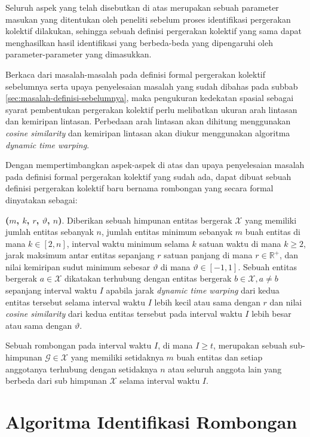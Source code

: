 Seluruh aspek yang telah disebutkan di atas merupakan sebuah parameter masukan yang ditentukan oleh peneliti sebelum proses identifikasi pergerakan kolektif dilakukan, sehingga sebuah definisi pergerakan kolektif yang sama dapat menghasilkan hasil identifikasi yang berbeda-beda yang dipengaruhi oleh parameter-parameter yang dimasukkan.

Berkaca dari masalah-masalah pada definisi formal pergerakan kolektif sebelumnya serta upaya penyelesaian masalah yang sudah dibahas pada subbab \ref{sec:masalah-definisi-sebelumnya}, maka pengukuran kedekatan spasial sebagai syarat pembentukan pergerakan kolektif perlu melibatkan ukuran arah lintasan dan kemiripan lintasan. Perbedaan arah lintasan akan dihitung menggunakan \textit{cosine similarity} dan kemiripan lintasan akan diukur menggunakan algoritma \textit{dynamic time warping}.

Dengan mempertimbangkan aspek-aspek di atas dan upaya penyelesaian masalah pada definisi formal pergerakan kolektif yang sudah ada, dapat dibuat sebuah definisi pergerakan kolektif baru bernama rombongan yang secara formal dinyatakan sebagai:

\noindent \textbf{\pergerakankolektif($m$, $k$, $r$, $\vartheta$, $n$)}. Diberikan sebuah himpunan entitas bergerak $\mathcal{X}$ yang memiliki jumlah entitas sebanyak $n$, jumlah entitas minimum sebanyak $m$ buah entitas di mana $k \in [2, n]$, interval waktu minimum selama $k$ satuan waktu di mana $k \geq 2$, jarak maksimum antar entitas sepanjang $r$ satuan panjang di mana $r \in \mathbb{R}^+$, dan nilai kemiripan sudut minimum sebesar $\vartheta$ di mana $\vartheta \in [-1, 1]$. Sebuah entitas bergerak $a \in \mathcal{X}$ dikatakan terhubung dengan entitas bergerak $b \in \mathcal{X}, a \neq b$ sepanjang interval waktu $I$ apabila jarak \textit{dynamic time warping} dari kedua entitas tersebut selama interval waktu $I$ lebih kecil atau sama dengan $r$ dan nilai \textit{cosine similarity} dari kedua entitas tersebut pada interval waktu $I$ lebih besar atau sama dengan $\vartheta$.

Sebuah rombongan pada interval waktu $I$, di mana $I \geq t$, merupakan sebuah sub-himpunan $\mathcal{G} \in \mathcal{X}$ yang memiliki setidaknya $m$ buah entitas dan setiap anggotanya terhubung dengan setidaknya $n$ atau seluruh anggota lain yang berbeda dari sub himpunan $\mathcal{X}$ selama interval waktu $I$.

\section{Algoritma Identifikasi Rombongan}
\label{sec:algoritma}
    
